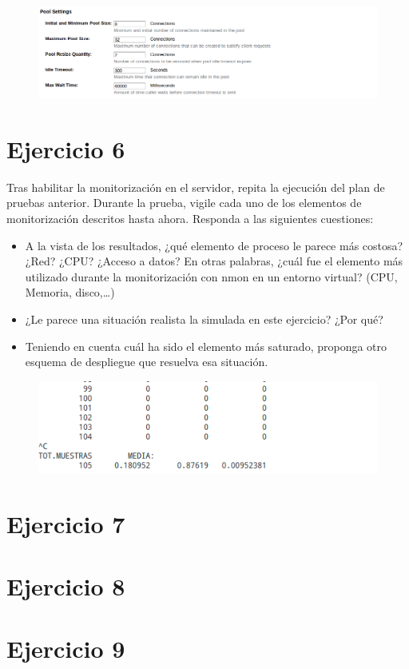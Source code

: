 \documentclass[a4paper, 10pt]{article}
\begin{document}
\begin{figure}[hbtp]
	 	\centering
	 	\includegraphics[width=1.1\textwidth]{../../p2/pantallazos/ej5_conf_5.png}
	 	\caption{}
\end{figure}

\section{Ejercicio 6}
\begin{mdframed} 
Tras habilitar la monitorización en el servidor, repita la ejecución del plan de pruebas 
anterior. Durante la prueba, vigile cada uno de los elementos de monitorización descritos hasta 
ahora. Responda a las siguientes cuestiones: 
\begin{itemize}
\item A la vista de los resultados, ¿qué elemento de proceso le parece más costosa? ¿Red? ¿CPU? 
¿Acceso a datos? En otras palabras, ¿cuál fue el elemento más utilizado durante la monitorización 
con nmon en un entorno virtual? (CPU, Memoria, disco,…) 
\item ¿Le parece una situación realista la simulada en este ejercicio? ¿Por qué? 
\item Teniendo en cuenta cuál ha sido el elemento más saturado, proponga otro esquema de despliegue 
que resuelva esa situación.
\end{itemize}
\end{mdframed}
\begin{figure}[hbtp]
	 	\centering
	 	\includegraphics[width=1.1\textwidth]{../../p2/pantallazos/si2_monitor_ej6.png}
	 	\caption{}
\end{figure}


\section{Ejercicio 7}
\begin{mdframed} 

\end{mdframed}

\section{Ejercicio 8}
\begin{mdframed} 

\end{mdframed}

\section{Ejercicio 9}
\begin{mdframed} 

\end{mdframed}
\end{document}
